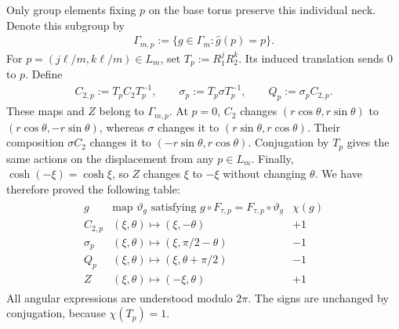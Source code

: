 \documentclass[a4paper,11pt,oneside,reqno]{amsart}
\numberwithin{equation}{section}
\theoremstyle{definition}
\begin{document}
Only group elements fixing $p$ on the base torus
preserve this individual neck. Denote this subgroup by
%
\begin{align*}
    \Gamma_{m,p}
    :=
    \{g\in\Gamma_m:\widehat g(p)=p\}.
\end{align*}
%
For $p=(j\ell/m,k\ell/m)\in L_m$, set
$T_p:=R_1^jR_2^k$. Its induced translation sends $0$
to $p$. Define
%
\begin{align*}
    C_{2,p}:=T_pC_2T_p^{-1},\qquad
    \sigma_p:=T_p\sigma T_p^{-1},\qquad
    Q_p:=\sigma_pC_{2,p}.
\end{align*}
%
These maps and $Z$ belong to $\Gamma_{m,p}$. At $p=0$,
$C_2$ changes $(r\cos\theta,r\sin\theta)$ to
$(r\cos\theta,-r\sin\theta)$, whereas $\sigma$
changes it to $(r\sin\theta,r\cos\theta)$.
Their composition $\sigma C_2$ changes it to
$(-r\sin\theta,r\cos\theta)$.
Conjugation by $T_p$ gives the same actions on the
displacement from any $p\in L_m$.
Finally, $\cosh(-\xi)=\cosh\xi$, so $Z$ changes
$\xi$ to $-\xi$ without changing $\theta$.
We have therefore proved the following table:
%
\begin{align*}
    \begin{array}{c|c|c}
        g&\text{map }\vartheta_g
        \text{ satisfying }g\circ F_{\tau,p}
        =F_{\tau,p}\circ\vartheta_g&\chi(g)\\ \hline
        C_{2,p}&(\xi,\theta)\mapsto(\xi,-\theta)&+1\\
        \sigma_p&(\xi,\theta)\mapsto(\xi,\pi/2-\theta)&-1\\
        Q_p&(\xi,\theta)\mapsto(\xi,\theta+\pi/2)&-1\\
        Z&(\xi,\theta)\mapsto(-\xi,\theta)&+1
    \end{array}
\end{align*}
%
All angular expressions are understood modulo $2\pi$.
The signs are unchanged by conjugation, because
$\chi(T_p)=1$.
\end{document}
